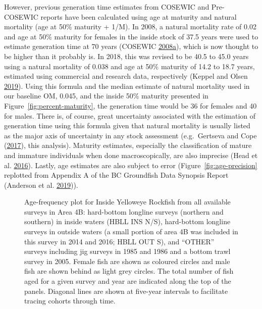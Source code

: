 \documentclass[11pt]{book}
\begin{document}
However, previous generation time estimates from COSEWIC and Pre-COSEWIC reports have been calculated using age at maturity and natural mortality (age at 50\% maturity + 1/M). In 2008, a natural mortality rate of 0.02 and age at 50\% maturity for females in the inside stock of 37.5 years were used to estimate generation time at 70 years (COSEWIC \protect\hyperlink{ref-cosewic2008}{2008}\protect\hyperlink{ref-cosewic2008}{a}), which is now thought to be higher than it probably is. In 2018, this was revised to be 40.5 to 45.0 years using a natural mortality of 0.038 and age at 50\% maturity of 14.2 to 18.7 years, estimated using commercial and research data, respectively (Keppel and Olsen \protect\hyperlink{ref-keppel2019}{2019}). Using this formula and the median estimate of natural mortality used in our baseline OM, 0.045, and the inside 50\% maturity presented in Figure~\ref{fig:percent-maturity}, the generation time would be 36 for females and 40 for males. There is, of course, great uncertainty associated with the estimation of generation time using this formula given that natural mortality is usually listed as the major axis of uncertainty in any stock assessment (e.g.~Gertseva and Cope (\protect\hyperlink{ref-gertseva2017}{2017}), this analysis). Maturity estimates, especially the classification of mature and immature individuals when done macroscopically, are also imprecise (Head et al. \protect\hyperlink{ref-head2016}{2016}). Lastly, age estimates are also subject to error (Figure~\ref{fig:age-precision} replotted from Appendix A of the BC Groundfish Data Synopsis Report (Anderson et al. \protect\hyperlink{ref-anderson2019synopsis}{2019})).

\clearpage


\begin{figure}[htb]

{\centering {} 

}

\caption{Age-frequency plot for Inside Yelloweye Rockfish from all available surveys in Area 4B: hard-bottom longline surveys (northern and southern) in inside waters (HBLL INS N/S), hard-bottom longline surveys in outside waters (a small portion of area 4B was included in this survey in 2014 and 2016; HBLL OUT S), and ``OTHER'' surveys including jig surveys in 1985 and 1986 and a bottom trawl survey in 2005. Female fish are shown as coloured circles and male fish are shown behind as light grey circles. The total number of fish aged for a given survey and year are indicated along the top of the panels. Diagonal lines are shown at five-year intervals to facilitate tracing cohorts through time.}\label{fig:age-freq}
\end{figure}
\end{document}
